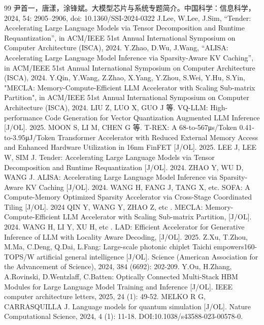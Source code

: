 \documentclass[12pt,a4paper]{article}%
\begin{document}
\begin{thebibliography}{99}
         尹首一，唐漾，涂锋斌。大模型芯片与系统专题简介。中国科学：信息科学，2024, 54: 2905–2906, doi: 10.1360/SSI-2024-0322
         J.Lee, W.Lee, J.Sim, “Tender: Accelerating Large Language Models via Tensor Decomposition and Runtime Requantization”, in ACM/IEEE 51st Annual International Symposium on Computer Architecture (ISCA), 2024.
         Y.Zhao, D.Wu, J.Wang, “ALISA: Accelerating Large Language Model Inference via Sparsity-Aware KV Caching”, in ACM/IEEE 51st Annual International Symposium on Computer Architecture (ISCA), 2024.
         Y.Qin, Y.Wang, Z.Zhao, X.Yang, Y.Zhou, S.Wei, Y.Hu, S.Yin, "MECLA: Memory-Compute-Efficient LLM Accelerator with Scaling Sub-matrix Partition", in ACM/IEEE 51st Annual International Symposium on Computer Architecture (ISCA), 2024.
         LIU Z, LUO X, GUO J 等. VQ-LLM: High-performance Code Generation for Vector Quantization Augmented LLM Inference [J/OL]. 2025.
         MOON S, LI M, CHEN G 等. T-REX: A 68-to-567μs/Token 0.41-to-3.95μJ/Token Transformer Accelerator with Reduced External Memory Access and Enhanced Hardware Utilization in 16nm FinFET [J/OL]. 2025.
         LEE J, LEE W, SIM J. Tender: Accelerating Large Language Models via Tensor Decomposition and Runtime Requantization [J/OL]. 2024.
         ZHAO Y, WU D, WANG J. ALISA: Accelerating Large Language Model Inference via Sparsity-Aware KV Caching [J/OL]. 2024.
         WANG H, FANG J, TANG X, etc. SOFA: A Compute-Memory Optimized Sparsity Accelerator via Cross-Stage Coordinated Tiling [J/OL]. 2024
         QIN Y, WANG Y, ZHAO Z, etc . MECLA: Memory-Compute-Efficient LLM Accelerator with Scaling Sub-matrix Partition, [J/OL]. 2024.
         WANG H, LI Y, XU H, etc . LAD: Efficient Accelerator for Generative Inference of LLM with Locality Aware Decoding, [J/OL]. 2025.
         Z.Xu, T.Zhou, M.Ma, C.Deng, Q.Dai, L.Fang: Large-scale photonic chiplet Taichi empowers160-TOPS/W artificial general intelligence [J/OL]. Science (American Association for the Advancement of Science), 2024, 384 (6692): 202-209.
         Y.Ou, H.Zhang, A.Rovinski, D.Wentzlaff, C.Batten: Optically Connected Multi-Stack HBM Modules for Large Language Model Training and Inference [J/OL]. IEEE computer architecture letters, 2025, 24 (1): 49-52.
         MELKO R G, CARRASQUILLA J. Language models for quantum simulation [J/OL]. Nature Computational Science, 2024, 4 (1): 11-18. DOI:10.1038/s43588-023-00578-0.

\end{thebibliography}
\end{document}
